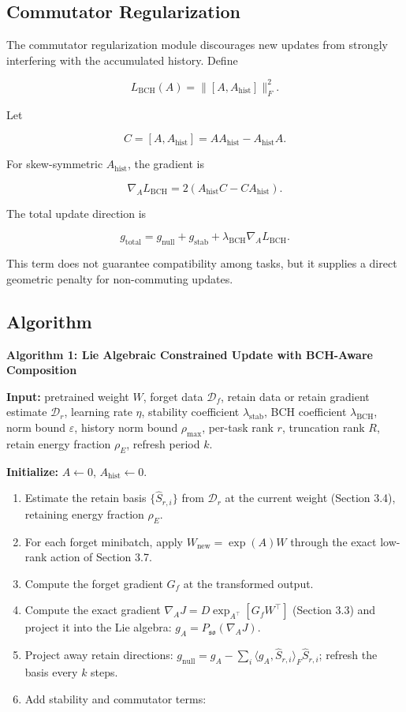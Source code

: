 \documentclass[
]{article}
\providecommand{\tightlist}{%
  \setlength{\itemsep}{0pt}\setlength{\parskip}{0pt}}
\begin{document}
\subsection{Commutator Regularization}\label{commutator-regularization}

The commutator regularization module discourages new updates from strongly interfering with the accumulated history. Define

\[
L_{\mathrm{BCH}}(A)=\|[A,A_{\mathrm{hist}}]\|_F^2.
\]

Let

\[
C=[A,A_{\mathrm{hist}}]=AA_{\mathrm{hist}}-A_{\mathrm{hist}}A.
\]

For skew-symmetric \(A_{\mathrm{hist}}\), the gradient is

\[
\nabla_A L_{\mathrm{BCH}}
=2(A_{\mathrm{hist}}C-CA_{\mathrm{hist}}).
\]

The total update direction is

\[
g_{\mathrm{total}}
=g_{\mathrm{null}}+g_{\mathrm{stab}}
+\lambda_{\mathrm{BCH}}\nabla_A L_{\mathrm{BCH}}.
\]

This term does not guarantee compatibility among tasks, but it supplies a direct geometric penalty for non-commuting updates.

\subsection{Algorithm}\label{algorithm}

\textbf{Algorithm 1: Lie Algebraic Constrained Update with BCH-Aware Composition}

\textbf{Input:} pretrained weight \(W\), forget data \(\mathcal{D}_f\), retain data or retain gradient estimate \(\mathcal{D}_r\), learning rate \(\eta\), stability coefficient \(\lambda_{\mathrm{stab}}\), BCH coefficient \(\lambda_{\mathrm{BCH}}\), norm bound \(\varepsilon\), history norm bound \(\rho_{\max}\), per-task rank \(r\), truncation rank \(R\), retain energy fraction \(\rho_E\), refresh period \(k\).

\textbf{Initialize:} \(A\leftarrow 0\), \(A_{\mathrm{hist}}\leftarrow 0\).

\begin{enumerate}
\def\labelenumi{\arabic{enumi}.}
\tightlist
\item
  Estimate the retain basis \(\{\widehat{S}_{r,i}\}\) from \(\mathcal{D}_r\) at the current weight (Section 3.4), retaining energy fraction \(\rho_E\).
\item
  For each forget minibatch, apply \(W_{\mathrm{new}}=\exp(A)W\) through the exact low-rank action of Section 3.7.
\item
  Compute the forget gradient \(G_f\) at the transformed output.
\item
  Compute the exact gradient \(\nabla_A J=D\exp_{A^\top}[G_fW^\top]\) (Section 3.3) and project it into the Lie algebra: \(g_A=P_{\mathfrak{so}}(\nabla_A J)\).
\item
  Project away retain directions: \(g_{\mathrm{null}}=g_A-\sum_i\langle g_A,\widehat{S}_{r,i}\rangle_F\widehat{S}_{r,i}\); refresh the basis every \(k\) steps.
\item
  Add stability and commutator terms:
\end{enumerate}
\end{document}
